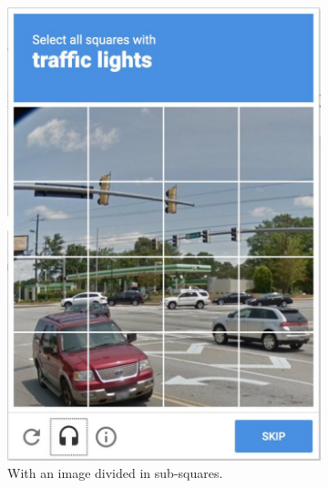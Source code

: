 \begin{itemize}
{\begin{figure}[h]
     \centering
     \begin{subfigure}[b]{0.48\textwidth}
         \centering
         \includegraphics[width=.9\linewidth]{Images/StateOfArt/image_CAPTCHA}
         \caption{\footnotesize{With an image divided in sub-squares.}}
         \label{soa:image}
     \end{subfigure}
     \hfill
     \begin{subfigure}[b]{0.48\textwidth}
         \centering

\end{subfigure}
\end{figure}}
\end{itemize}
